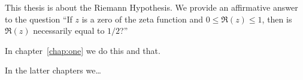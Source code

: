 %
This thesis is about the Riemann Hypothesis. We provide an
affirmative answer to the question ``If $z$ is a zero of the
zeta function and $0\le \Re(z)\le1$, then is $\Re(z)$
necessarily equal to $1/2$?''

In chapter~\ref{chap:one} we do this and that.

In the latter chapters we\ldots
